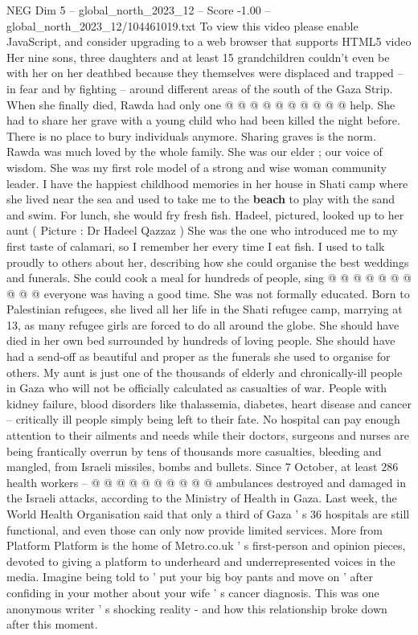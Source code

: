 \begin{textsample}{NEG Dim 5 – global\_north\_2023\_12 – Score -1.00 – global\_north\_2023\_12/104461019.txt}
To view this video please enable JavaScript, and consider upgrading to a web browser that supports HTML5 video Her nine sons, three daughters and at least 15 grandchildren couldn't even be with her on her deathbed because they themselves were displaced and trapped -- in fear and by fighting -- around different areas of the south of the Gaza Strip.
When she finally died, Rawda had only one @ @ @ @ @ @ @ @ @ @ help.
She had to share her grave with a young child who had been killed the night before.
There is no place to bury individuals anymore.
Sharing graves is the norm.
Rawda was much loved by the whole family.
She was our elder ; our voice of wisdom.
She was my first role model of a strong and wise woman community leader.
I have the happiest childhood memories in her house in Shati camp where she lived near the sea and used to take me to the \textbf{beach} to play with the sand and swim.
For lunch, she would fry fresh fish.
Hadeel, pictured, looked up to her aunt ( Picture : Dr Hadeel Qazzaz ) She was the one who introduced me to my first taste of calamari, so I remember her every time I eat fish.
I used to talk proudly to others about her, describing how she could organise the best weddings and funerals.
She could cook a meal for hundreds of people, sing @ @ @ @ @ @ @ @ @ @ everyone was having a good time.
She was not formally educated.
Born to Palestinian refugees, she lived all her life in the Shati refugee camp, marrying at 13, as many refugee girls are forced to do all around the globe.
She should have died in her own bed surrounded by hundreds of loving people.
She should have had a send-off as beautiful and proper as the funerals she used to organise for others.
My aunt is just one of the thousands of elderly and chronically-ill people in Gaza who will not be officially calculated as casualties of war.
People with kidney failure, blood disorders like thalassemia, diabetes, heart disease and cancer -- critically ill people simply being left to their fate.
No hospital can pay enough attention to their ailments and needs while their doctors, surgeons and nurses are being frantically overrun by tens of thousands more casualties, bleeding and mangled, from Israeli missiles, bombs and bullets.
Since 7 October, at least 286 health workers -- @ @ @ @ @ @ @ @ @ @ ambulances destroyed and damaged in the Israeli attacks, according to the Ministry of Health in Gaza.
Last week, the World Health Organisation said that only a third of Gaza ' s 36 hospitals are still functional, and even those can only now provide limited services.
More from Platform Platform is the home of Metro.co.uk ' s first-person and opinion pieces, devoted to giving a platform to underheard and underrepresented voices in the media.
Imagine being told to ' put your big boy pants and move on ' after confiding in your mother about your wife ' s cancer diagnosis.
This was one anonymous writer ' s shocking reality - and how this relationship broke down after this moment.

\end{textsample}
